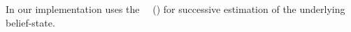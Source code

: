 

In our implementation uses the
~\citeauthor{king:2009}~(\citeyear{king:2009})  for
successive estimation of the underlying belief-state.
